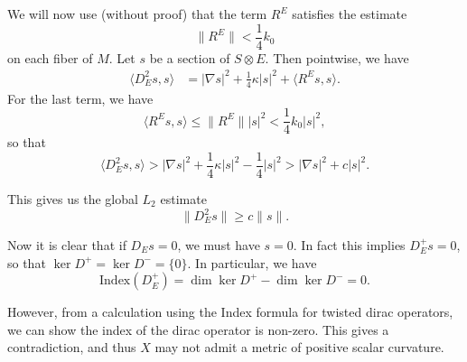 \documentclass[11pt, reqno]{beamer}
\begin{document}
\begin{frame}
    We will now use (without proof) that the term $R^E$ satisfies the estimate
    \[
        \|R^E\| < \frac{1}{4}k_0
    \]
    on each fiber of $M$. Let $s$ be a section of $S\otimes E$. Then pointwise, we have
    \begin{align}
        \langle D_E^2 s, s\rangle & = |\nabla s|^2 + \frac{1}{4}\kappa |s|^2 + \langle R^E s, s\rangle.
    \end{align}
    For the last term, we have
    \[
        \langle R^E s, s \rangle \leq \|R^E\||s|^2 < \frac{1}{4}k_0 |s|^2,
    \]
    so that
    \[
        \langle D_E^2 s, s\rangle > |\nabla s|^2 + \frac{1}{4}\kappa |s|^2 - \frac{1}{4}|s|^2 > |\nabla s|^2 + c|s|^2.
    \]

    This gives us the global $L_2$ estimate
    \[
        \|D_E^2 s\| \geq c\|s\|.
    \]
\end{frame}

\begin{frame}
    Now it is clear that if $D_E s = 0$, we must have $s = 0$. In fact this implies $D_E^+ s = 0$, so that 
    $\ker D^+ = \ker D^- = \{0\}$. In particular, we have
    \[
        \text{Index}(D_E^+) = \dim\ker D^+ - \dim\ker D^- = 0.
    \]

    However, from a calculation using the Index formula for twisted dirac operators, we can show the index of 
    the dirac operator is non-zero. This gives a contradiction, and thus $X$ may not admit a metric 
    of positive scalar curvature. 
\end{frame}
\end{document}

